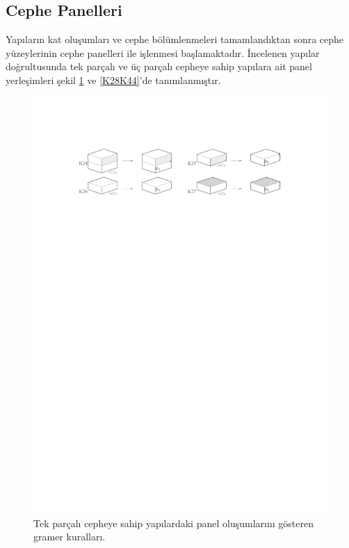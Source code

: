 \documentclass[12pt,turkish,a4paperpaper,]{report}
\begin{document}
\hypertarget{cephe-panelleri}{%
\subsection{Cephe Panelleri}\label{cephe-panelleri}}

Yapıların kat oluşumları ve cephe bölümlenmeleri tamamlandıktan sonra
cephe yüzeylerinin cephe panelleri ile işlenmesi başlamaktadır.
İncelenen yapılar doğrultusunda tek parçalı ve üç parçalı cepheye sahip
yapılara ait panel yerleşimleri şekil \ref{K24K27} ve \ref{K28K44}'de
tanımlanmıştır.

\begin{figure}
\centering
\includegraphics[width=1\textwidth,height=\textheight]{source/figures/K24-K27.pdf}
\caption{Tek parçalı cepheye sahip yapılardaki panel oluşumlarını
gösteren gramer kuralları. \label{K24K27}}
\end{figure}
\end{document}
